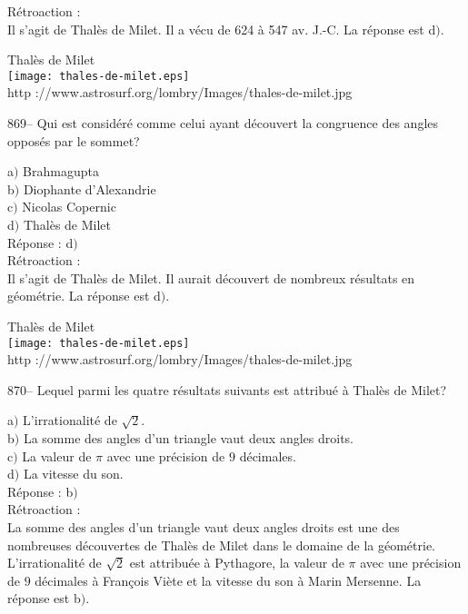 ﻿\documentclass[letterpaper, 12pt]{article}
\begin{document}
R\'etroaction :\\
Il s'agit de Thal\`es de Milet. Il a v\'ecu de 624 \`a 547 av. J.-C.
La r\'eponse est d$)$.

        \begin{center}
        Thal\`es de Milet\\
    \texttt{[image: thales-de-milet.eps]}\\
        {\footnotesize http
://www.astrosurf.org/lombry/Images/thales-de-milet.jpg}
    \end{center}

869-- Qui est consid\'er\'e comme celui ayant d\'ecouvert la
congruence des angles oppos\'es par le sommet?

a$)$ Brahmagupta \\
b$)$ Diophante d'Alexandrie \\
c$)$ Nicolas Copernic \\
d$)$ Thal\`es de Milet \\

R\'eponse : d$)$\\

R\'etroaction :\\
Il s'agit de Thal\`es de Milet. Il aurait d\'ecouvert de nombreux
r\'esultats en g\'eom\'etrie. La r\'eponse est d$)$.

        \begin{center}
        Thal\`es de Milet\\
    \texttt{[image: thales-de-milet.eps]}\\
        {\footnotesize http
://www.astrosurf.org/lombry/Images/thales-de-milet.jpg}
    \end{center}

870-- Lequel parmi les quatre r\'esultats suivants est attribu\'e
\`a Thal\`es de Milet?

a$)$ L'irrationalit\'e de $\sqrt2$. \\
b$)$ La somme des angles d'un triangle vaut deux angles droits. \\
c$)$ La valeur de $\pi$ avec une pr\'ecision de $9$ d\'ecimales. \\
d$)$ La vitesse du son. \\

R\'eponse : b$)$\\

R\'etroaction : \\
La somme des angles d'un triangle vaut deux angles droits est une
des nombreuses d\'ecouvertes de Thal\`es de Milet dans le domaine de
la g\'eom\'etrie. L'irrationalit\'e de $\sqrt2$ est attribu\'ee \`a
Pythagore, la valeur de $\pi$ avec une pr\'ecision de $9$
d\'ecimales \`a Fran\c cois Vi\`ete
et la vitesse du son \`a Marin Mersenne. La r\'eponse est b$)$.\\
\end{document}
